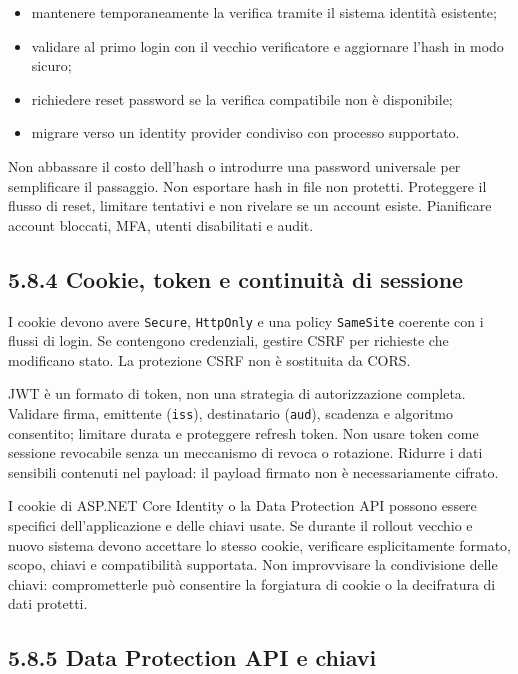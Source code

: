 \documentclass[
  italian,
  10pt,
]{book}
\providecommand{\tightlist}{%
  \setlength{\itemsep}{0pt}\setlength{\parskip}{0pt}}
\begin{document}
\begin{itemize}
\tightlist
\item
  mantenere temporaneamente la verifica tramite il sistema identità
  esistente;
\item
  validare al primo login con il vecchio verificatore e aggiornare
  l'hash in modo sicuro;
\item
  richiedere reset password se la verifica compatibile non è
  disponibile;
\item
  migrare verso un identity provider condiviso con processo supportato.
\end{itemize}

Non abbassare il costo dell'hash o introdurre una password universale
per semplificare il passaggio. Non esportare hash in file non protetti.
Proteggere il flusso di reset, limitare tentativi e non rivelare se un
account esiste. Pianificare account bloccati, MFA, utenti disabilitati e
audit.

\subsection{5.8.4 Cookie, token e continuità di
sessione}\label{cookie-token-e-continuituxe0-di-sessione}

I cookie devono avere \texttt{Secure}, \texttt{HttpOnly} e una policy
\texttt{SameSite} coerente con i flussi di login. Se contengono
credenziali, gestire CSRF per richieste che modificano stato. La
protezione CSRF non è sostituita da CORS.

JWT è un formato di token, non una strategia di autorizzazione completa.
Validare firma, emittente (\texttt{iss}), destinatario (\texttt{aud}),
scadenza e algoritmo consentito; limitare durata e proteggere refresh
token. Non usare token come sessione revocabile senza un meccanismo di
revoca o rotazione. Ridurre i dati sensibili contenuti nel payload: il
payload firmato non è necessariamente cifrato.

I cookie di ASP.NET Core Identity o la Data Protection API possono
essere specifici dell'applicazione e delle chiavi usate. Se durante il
rollout vecchio e nuovo sistema devono accettare lo stesso cookie,
verificare esplicitamente formato, scopo, chiavi e compatibilità
supportata. Non improvvisare la condivisione delle chiavi:
comprometterle può consentire la forgiatura di cookie o la decifratura
di dati protetti.

\subsection{5.8.5 Data Protection API e
chiavi}\label{data-protection-api-e-chiavi}
\end{document}
